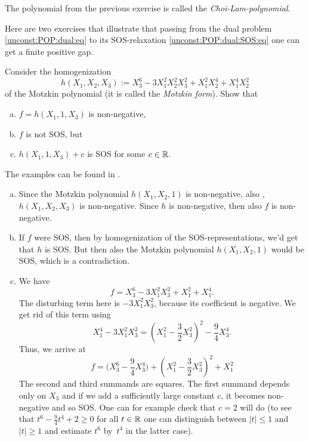 The polynomial from the previous exercise is called the \emph{Choi-Lam-polynomial}. 

Here are two exercises that illustrate that passing from the dual problem \eqref{unconst:POP:dual:eq} to its SOS-relaxation \eqref{unconst:POP:dual:SOS:eq} one can get a finite positive gap. 

\begin{exercise}
	\label{parrilo:example}
	Consider the homogenization
	\[
	h(X_1,X_2,X_3) := X_3^6 -3 X_1^2 X_2^2 X_3^2 + X_1^2 X_2^4 + X_1^4 X_2^2
	\]
	of the Motzkin polynomial (it is called the \emph{Motzkin form}). Show that 
	\begin{enumerate}[(a)]
		\item $f = h(X_1,1,X_3)$ is non-negative, 
		\item $f$ is not SOS, but 
		\item $h(X_1,1,X_3) +c$ is SOS for some $c \in \mathbb{R}$. 
	\end{enumerate}
\end{exercise}
\begin{solution}
	The examples can be found in \cite[Example~7.2]{Parrilo:2003}.
	\begin{enumerate}[(a)]
	\item Since the Motzkin polynomial $h(X_1,X_2,1)$ is non-negative, also , $h(X_1,X_2,X_3)$ is non-negative. Since $h$ is non-negative, then also $f$ is non-negative. 
	\item If $f$ were SOS, then by homogenization of the SOS-representations, we'd get that $h$ is SOS. But then also the Motzkin polynomial $h(X_1,X_2,1)$ would be SOS, which is a contradiction. 
	\item We have
	\[
		f=X_3^6 - 3 X_1^2 X_3^2 + X_1^2 + X_1^4 .
	\]
	The disturbing term here is $- 3 X_1^2 X_3^2$, because its coefficient is negative. We get rid of this term using 
	\[
		X_1^4  - 3 X_1^2 X_3^2 = (X_1^2 - \frac{3}{2} X_3^2)^2 - \frac{9}{4} X_3^4.
	\]
	Thus, we arrive at
	\[
		f = \bigl(X_3^6 - \frac{9}{4} X_3^4 \bigr) + (X_1^2 - \frac{3}{2} X_3^2)^2 + X_1^2
	\]
	The second and third summands are squares. The first summand depends only on $X_3$ and if we add a sufficiently large constant $c$, it becomes non-negative and so SOS. One can for example check that $c=2$ will do (to see that $t^6 - \frac{9}{4} t^4 + 2 \ge 0$ for all $t \in \mathbb{R}$ one can distinguish between $|t| \le 1$ and $|t| \ge 1$ and estimate $t^6$ by~$t^4$ in the latter case).\qedhere
	\end{enumerate}
\end{solution}

